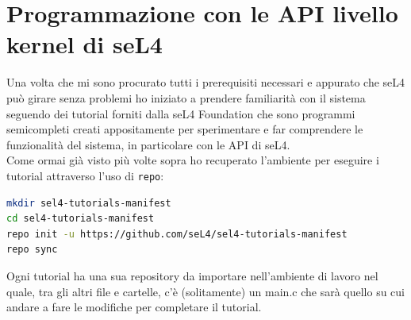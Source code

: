 \section{Programmazione con le API livello kernel di seL4}
Una volta che mi sono procurato tutti i prerequisiti necessari e appurato che seL4 può girare senza problemi ho iniziato a prendere familiarità con il sistema seguendo dei tutorial forniti dalla seL4 Foundation che sono programmi semicompleti creati appositamente per sperimentare e far comprendere le funzionalità del sistema, in particolare con le API di seL4. \cite{sel4API}\\
Come ormai già visto più volte sopra ho recuperato l'ambiente per eseguire i tutorial attraverso l'uso di \texttt{repo}:
\begin{lstlisting}[language=bash]
mkdir sel4-tutorials-manifest
cd sel4-tutorials-manifest
repo init -u https://github.com/seL4/sel4-tutorials-manifest
repo sync
\end{lstlisting}
Ogni tutorial ha una sua repository da importare nell'ambiente di lavoro nel quale, tra gli altri file e cartelle, c'è (solitamente) un main.c che sarà quello su cui andare a fare le modifiche per completare il tutorial.

